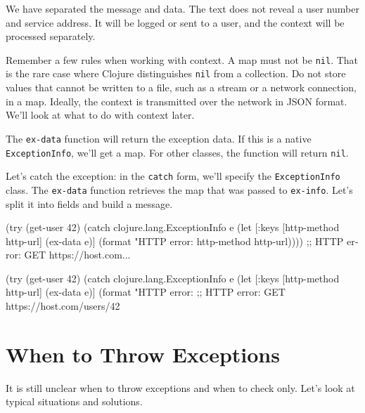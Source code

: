 We have separated the message and data. The text does not reveal a user number and service address. It will be logged or sent to a user, and the context will be processed separately.

Remember a few rules when working with context. A map must not be \verb|nil|. That is the rare case where Clojure distinguishes \verb|nil| from a collection. Do not store values that cannot be written to a file, such as a stream or a network connection, in a map. Ideally, the context is transmitted over the network in JSON format. We'll look at what to do with context later.

The \verb|ex-data| function will return the exception data. If this is a native \verb|ExceptionInfo|, we'll get a map. For other classes, the function will return \verb|nil|.


Let's catch the exception: in the \verb|catch| form, we'll specify the \verb|ExceptionInfo| class. The \verb|ex-data| function retrieves the map that was passed to \verb|ex-info|.
Let's split it into fields and build a message.

\ifx\DEVICETYPE\MOBILE

\begin{english}
  \begin{clojure}
(try
  (get-user 42)
  (catch clojure.lang.ExceptionInfo e
    (let [{:keys [http-method http-url]}
          (ex-data e)]
      (format "HTTP error: %
        http-method http-url))))
;; HTTP error: GET https://host.com...
  \end{clojure}
\end{english}

\else

\begin{english}
  \begin{clojure}
(try
  (get-user 42)
  (catch clojure.lang.ExceptionInfo e
    (let [{:keys [http-method http-url]} (ex-data e)]
      (format "HTTP error: %
;; HTTP error: GET https://host.com/users/42
  \end{clojure}
\end{english}

\fi

\section{When to Throw Exceptions}

It is still unclear when to throw exceptions and when to check only. Let's look at typical situations and solutions.

